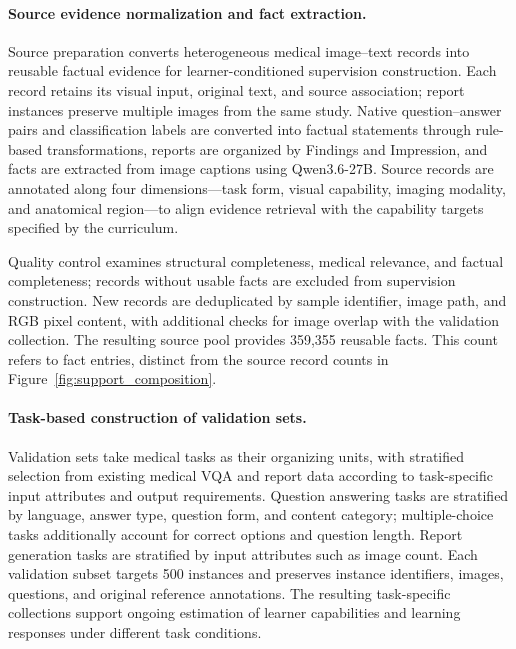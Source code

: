 \begin{samepage}
\paragraph{Source evidence normalization and fact extraction.}
\label{app:data_preparation}
Source preparation converts heterogeneous medical image--text records into reusable factual evidence for learner-conditioned supervision construction. Each record retains its visual input, original text, and source association; report instances preserve multiple images from the same study. Native question--answer pairs and classification labels are converted into factual statements through rule-based transformations, reports are organized by Findings and Impression, and facts are extracted from image captions using Qwen3.6-27B. Source records are annotated along four dimensions---task form, visual capability, imaging modality, and anatomical region---to align evidence retrieval with the capability targets specified by the curriculum.

Quality control examines structural completeness, medical relevance, and factual completeness; records without usable facts are excluded from supervision construction. New records are deduplicated by sample identifier, image path, and RGB pixel content, with additional checks for image overlap with the validation collection. The resulting source pool provides 359,355 reusable facts. This count refers to fact entries, distinct from the source record counts in Figure~\ref{fig:support_composition}.

\par
\end{samepage}

\paragraph{Task-based construction of validation sets.}
Validation sets take medical tasks as their organizing units, with stratified selection from existing medical VQA and report data according to task-specific input attributes and output requirements. Question answering tasks are stratified by language, answer type, question form, and content category; multiple-choice tasks additionally account for correct options and question length. Report generation tasks are stratified by input attributes such as image count. Each validation subset targets 500 instances and preserves instance identifiers, images, questions, and original reference annotations. The resulting task-specific collections support ongoing estimation of learner capabilities and learning responses under different task conditions.

